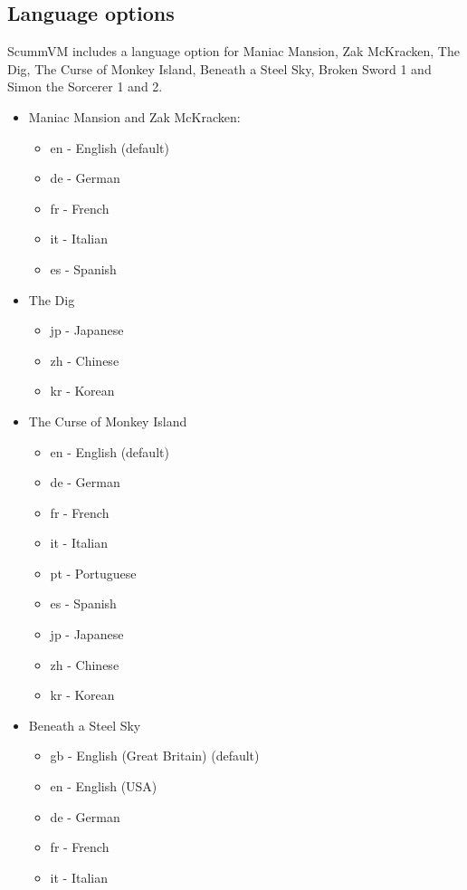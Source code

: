 \subsection{Language options}  \label{sect-languages}

ScummVM includes a language option for Maniac Mansion, Zak McKracken, The Dig,
The Curse of Monkey Island, Beneath a Steel Sky, Broken Sword 1 and
Simon the Sorcerer 1 and 2.

\begin{itemize}
\item Maniac Mansion and Zak McKracken:
  \begin{itemize}
   \item en  - English (default)
   \item de  - German
   \item fr  - French
   \item it  - Italian
   \item es  - Spanish
  \end{itemize}
\item The Dig
  \begin{itemize}
  \item jp  - Japanese
  \item zh  - Chinese
  \item kr  - Korean 
  \end{itemize}
\item The Curse of Monkey Island
  \begin{itemize}
  \item en  - English (default)
  \item de  - German
  \item fr  - French
  \item it  - Italian
  \item pt  - Portuguese
  \item es  - Spanish
  \item jp  - Japanese
  \item zh  - Chinese
  \item kr  - Korean
  \end{itemize}
\item Beneath a Steel Sky
  \begin{itemize}
  \item gb  - English (Great Britain) (default)
  \item en  - English (USA)
  \item de  - German
  \item fr  - French
  \item it  - Italian

\end{itemize}
\end{itemize}
